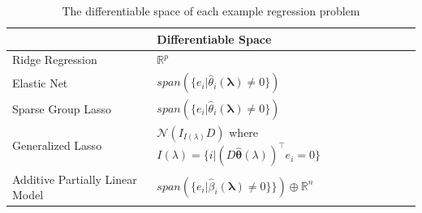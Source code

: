 \documentclass[10pt,letterpaper]{article}
\begin{document}
\begin{table} 
\begin{center}

\begin{tabular}{| l | l | l | }
\hline
 &  Differentiable Space \\
\hline
Ridge Regression & $\mathbb{R}^p$\\
\hline
Elastic Net & $span(\{e_i | \hat{\theta}_i\left(\boldsymbol{\lambda}\right) \ne 0 \})$\\
\hline
Sparse Group Lasso & $span(\{e_i | \hat{\theta}_i\left(\boldsymbol{\lambda}\right) \ne 0 \})$ \\
\hline
Generalized Lasso & $\mathcal{N}(I_{I(\lambda)} D)$ where $I(\lambda) = \{ i | (D \hat{\boldsymbol{\theta}}(\lambda))^\top e_i = 0 \}$ \\
\hline
Additive Partially Linear Model & $span(\{e_i | \hat{\beta}_i\left(\boldsymbol{\lambda}\right) \ne 0 \} \})  \oplus  \mathbb{R}^{n}$\\
\hline
\end{tabular}
\end{center}
\caption {The differentiable space of each example regression problem}
\label{table:differentiableSpace}
\end{table}
\end{document}
